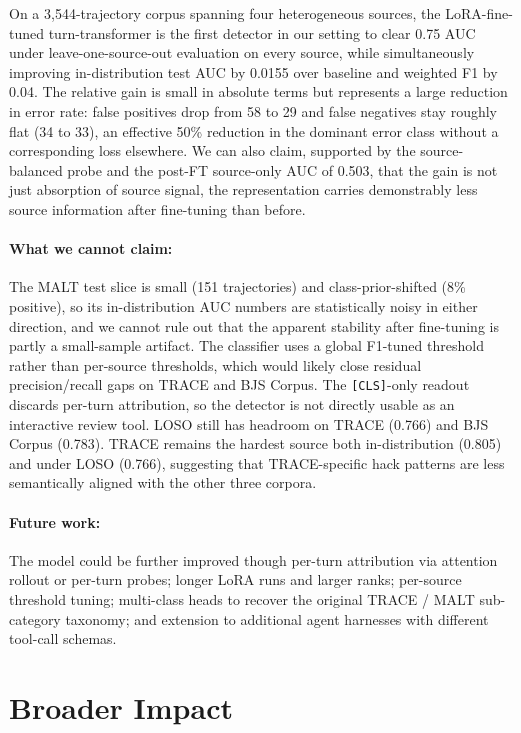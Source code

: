 \documentclass{article}
\begin{document}
On a 3{,}544-trajectory corpus spanning four heterogeneous sources, the LoRA-fine-tuned turn-transformer is the first detector in our setting to clear 0.75 AUC under leave-one-source-out evaluation on every source, while simultaneously improving in-distribution test AUC by 0.0155 over baseline and weighted F1 by 0.04. The relative gain is small in absolute terms but represents a large reduction in error rate: false positives drop from 58 to 29 and false negatives stay roughly flat (34 to 33), an effective 50\% reduction in the dominant error class without a corresponding loss elsewhere. We can also claim, supported by the source-balanced probe and the post-FT source-only AUC of 0.503, that the gain is not just absorption of source signal, the representation carries demonstrably less source information after fine-tuning than before.

\paragraph{What we cannot claim:} 

The MALT test slice is small (151 trajectories) and class-prior-shifted (8\% positive), so its in-distribution AUC numbers are statistically noisy in either direction, and we cannot rule out that the apparent stability after fine-tuning is partly a small-sample artifact. The classifier uses a global F1-tuned threshold rather than per-source thresholds, which would likely close residual precision/recall gaps on TRACE and BJS Corpus. The \texttt{[CLS]}-only readout discards per-turn attribution, so the detector is not directly usable as an interactive review tool. LOSO still has headroom on TRACE (0.766) and BJS Corpus (0.783). TRACE remains the hardest source both in-distribution (0.805) and under LOSO (0.766), suggesting that TRACE-specific hack patterns are less semantically aligned with the other three corpora.

\paragraph{Future work:}

The model could be further improved though per-turn attribution via attention rollout or per-turn probes; longer LoRA runs and larger ranks; per-source threshold tuning; multi-class heads to recover the original TRACE / MALT sub-category taxonomy; and extension to additional agent harnesses with different tool-call schemas.


\section{Broader Impact}
\end{document}
